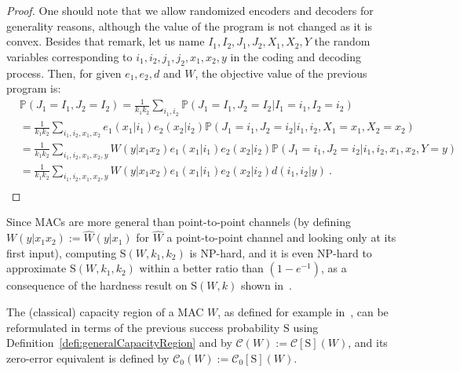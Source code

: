 \begin{proof}
One should note that we allow randomized encoders and decoders for generality reasons, although the value of the program is not changed as it is convex. Besides that remark, let us name $I_1,I_2,J_1,J_2,X_1,X_2,Y$ the random variables corresponding to $i_1,i_2,j_1,j_2,x_1,x_2,y$ in the coding and decoding process. Then, for given $e_1,e_2,d$ and $W$, the objective value of the previous program is:
\begin{equation}
  \begin{aligned}
    &\mathbb{P}\left(J_1 = I_1, J_2 = I_2\right) = \frac{1}{k_1k_2}\sum_{i_1,i_2} \mathbb{P}\left(J_1 = I_1, J_2 = I_2|I_1=i_1,I_2=i_2\right)\\
    &= \frac{1}{k_1k_2}\sum_{i_1,i_2,x_1,x_2}e_1(x_1|i_1)e_2(x_2|i_2) \mathbb{P}\left(J_1 = i_1, J_2 = i_2|i_1,i_2,X_1=x_1,X_2=x_2\right)\\
    &= \frac{1}{k_1k_2}\sum_{i_1,i_2,x_1,x_2,y}W(y|x_1x_2)e_1(x_1|i_1)e_2(x_2|i_2)\mathbb{P}\left(J_1 = i_1,J_2=i_2|i_1,i_2,x_1,x_2,Y=y\right)\\
    &= \frac{1}{k_1k_2}\sum_{i_1,i_2,x_1,x_2,y}W(y|x_1x_2)e_1(x_1|i_1)e_2(x_2|i_2)d(i_1,i_2|y) \ .\\
      \end{aligned}
\end{equation}
\end{proof}

Since MACs are more general than point-to-point channels (by defining $W(y|x_1x_2):=\hat{W}(y|x_1)$ for $\hat{W}$ a point-to-point channel and looking only at its first input), computing $\mathrm{S}(W,k_1,k_2)$ is \textrm{NP}-hard, and it is even \textrm{NP}-hard to approximate $\mathrm{S}(W,k_1,k_2)$ within a better ratio than $\left(1-e^{-1}\right)$, as a consequence of the hardness result on $\mathrm{S}(W,k)$ shown in~\cite{BF18}.


The (classical) capacity region of a MAC $W$, as defined for example in~\cite{CT01}, can be reformulated in terms of the previous success probability $\mathrm{S}$ using Definition~\ref{defi:generalCapacityRegion} and by $\mathcal{C}(W) := \mathcal{C}[\mathrm{S}](W)$, and its zero-error equivalent is defined by $\mathcal{C}_0(W) := \mathcal{C}_0[\mathrm{S}](W)$.


